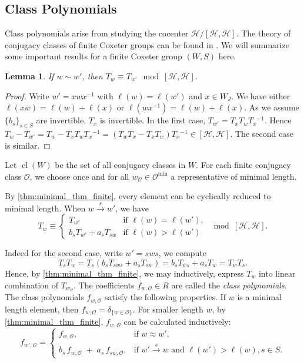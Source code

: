 \documentclass[a4paper, reqno, 14pt]{amsart}
\def\i{{^{-1}}}
\def\co{\mathcal{O}}
\def\ch{\mathcal{H}}
\DeclareMathOperator{\cl}{cl}
\newtheorem{lem}[thm]{Lemma}
\theoremstyle{definition}
\theoremstyle{remark}
\numberwithin{equation}{section}
\numberwithin{thm}{section}
\begin{document}
\subsection{Class Polynomials}
Class polynomials arise from studying the cocenter $\ch/[\ch,\ch]$. The theory of conjugacy classes of finite Coxeter groups can be found in \cite[\S 8]{geck2000characters}. We will summarize some important results for a finite Coxeter group $(W,S)$ here.

\begin{lem}\label{lem:sameimg}
    If $w\sim w'$, then $T_w\equiv T_{w'} \mod [\ch,\ch]$.
\end{lem}
\begin{proof}
    Write $w'=xwx\i$ with $\ell(w)=\ell(w')$ and $x\in W_J$. We have either $\ell(xw)=\ell(w)+\ell(x)$ or $\ell(wx\i)=\ell(w)+\ell(x)$. As we assume $\{b_s\}_{s\in S}$ are invertible, $T_x$ is invertible. In the first case, $T_{w'}=T_x T_w T_{x}\i$. Hence $T_w-T_{w'}= T_w-T_x T_w T_{x}\i=(T_wT_x-T_xT_w)T_x\i\in [\ch,\ch]$. The second case is similar.
\end{proof}

        Let $\cl(W)$ be the set of all conjugacy classes in $W$. For each finite conjugacy class $\co$, we choose once and for all $w_{\co}\in \co^{\min}$ a representative of minimal length.

        By \cref{thm:minimal_thm_finite}, every element can be cyclically reduced to minimal length. 
        When \( w \xrightarrow{s} w' \), we have
        \[
        T_w \equiv 
        \begin{cases}
        T_{w'} & \text{if } \ell(w) = \ell(w'), \\
        b_s T_{w'} + a_s T_{sw} & \text{if } \ell(w) > \ell(w')
        \end{cases}
        \mod [\mathcal{H}, \mathcal{H}].
        \]
        
        Indeed for the second case, write \( w' = sws \), we compute
        \[
        T_s T_w = T_s(b_s T_{sws} + a_s T_{sw}) = b_s T_{ws} + a_s T_w = T_w T_s.
        \]
        Hence, by \cref{thm:minimal_thm_finite}, we may inductively, express $T_w$ into linear combination of $T_{w_\co}$. The coefficients $f_{w,\co}\in R$ are called the \emph{class polynomials}. The class polynomials $f_{w,\co}$ satisfy the following properties. If $w$ is a minimal length element, then $f_{w,\co}=\delta_{\{w\in \co\}}$. For smaller length $w$, by \cref{thm:minimal_thm_finite}, $f_{w,\co}$ can be calculated inductively:
        \begin{equation} \label{eq:fmin-recursion}
            f_{w',\co}
              = \begin{cases}
                  f_{w,\co}, & \text{if } w \approx w', \\[6pt]
                  b_s\,f_{w,\co} \;+\; a_s\,f_{s w,\co}, & \text{if } w' \xrightarrow{s} w\text{ and } \ell(w')>\ell(w), s\in S.
                \end{cases}
        \end{equation}
        
\end{document}
